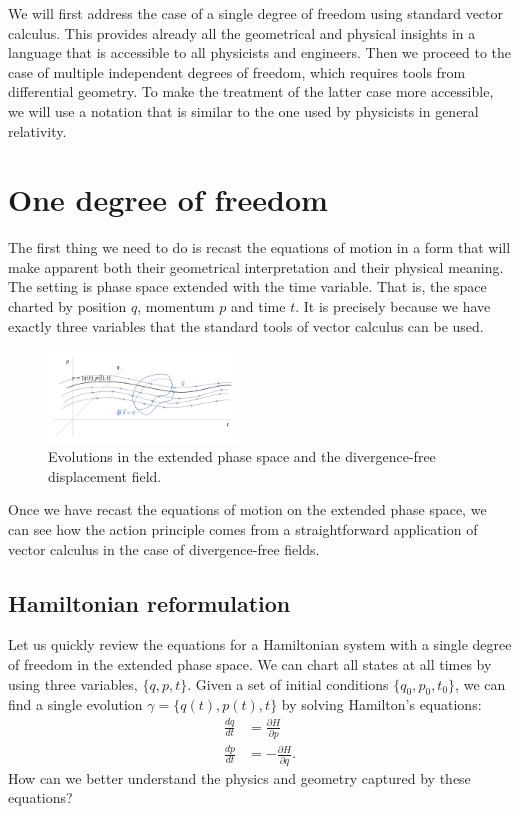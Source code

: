 \documentclass[10pt,twocolumn, nofootinbib]{revtex4-2}
\begin{document}
We will first address the case of a single degree of freedom using standard vector calculus. This provides already all the geometrical and physical insights in a language that is accessible to all physicists and engineers. Then we proceed to the case of multiple independent degrees of freedom, which requires tools from differential geometry. To make the treatment of the latter case more accessible, we will use a notation that is similar to the one used by physicists in general relativity.

\section{One degree of freedom}

The first thing we need to do is recast the equations of motion in a form that will make apparent both their geometrical interpretation and their physical meaning. The setting is phase space extended with the time variable. That is, the space charted by position $q$, momentum $p$ and time $t$. It is precisely because we have exactly three variables that the standard tools of vector calculus can be used.

\begin{figure}
	\includegraphics[width = 0.45\textwidth]{ExtendedPhaseSpace}
	\caption{\footnotesize{Evolutions in the extended phase space and the divergence-free displacement field.}}\label{extended_phase_space}
\end{figure}


Once we have recast the equations of motion on the extended phase space, we can see how the action principle comes from a straightforward application of vector calculus in the case of divergence-free fields.

\subsection{Hamiltonian reformulation}

Let us quickly review the equations for a Hamiltonian system with a single degree of freedom in the extended phase space. We can chart all states at all times by using three variables, $\{q,p,t\}$. Given a set of initial conditions $\{q_0,p_0,t_0\}$, we can find a single evolution $\gamma = \{q(t), p(t), t\}$ by solving Hamilton's equations:
\begin{equation}\label{Hamilton_equations}
\begin{aligned}
	\frac{dq}{dt} &= \frac{\partial H}{\partial p} \\
	\frac{dp}{dt} &= -\frac{\partial H}{\partial q}.
\end{aligned}
\end{equation}
How can we better understand the physics and geometry captured by these equations?
\end{document}

